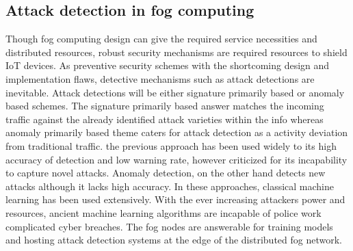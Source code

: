 \subsection*{Attack detection in fog computing}
Though fog computing design can give the required service necessities and distributed resources, robust security mechanisms are required resources to shield IoT devices. As preventive security schemes  with the shortcoming design and implementation flaws, detective mechanisms such as attack detections are inevitable. Attack detections will be either signature primarily based or anomaly
based schemes. The signature primarily based answer matches the incoming traffic against the already identified attack varieties within the info whereas anomaly primarily based theme caters for attack detection as a activity deviation
from traditional traffic. the previous approach has been used widely to its high accuracy of detection and low warning rate, however criticized for its incapability to capture novel attacks. Anomaly detection, on the other hand  detects new attacks although it lacks high accuracy. In these approaches, classical machine learning has been used extensively. With the ever increasing  attackers power and
resources, ancient machine learning algorithms are incapable of police work complicated cyber breaches. The fog nodes are answerable for training models and hosting attack detection systems at the edge of the distributed fog network.




 










